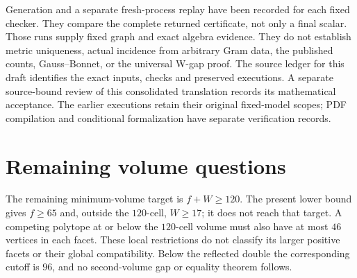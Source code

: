\documentclass[11pt]{article}
\theoremstyle{remark}
\begin{document}
Generation and a separate fresh-process replay have been recorded for
each fixed checker. They compare the complete returned certificate,
not only a final scalar. Those runs supply fixed graph and exact
algebra evidence. They do not establish metric uniqueness, actual
incidence from arbitrary Gram data, the published counts, Gauss--Bonnet,
or the universal W-gap proof. The source ledger for this draft identifies
the exact inputs, checks and preserved executions. A separate source-bound review of this consolidated translation records
its mathematical acceptance. The earlier executions retain their original
fixed-model scopes; PDF compilation and conditional formalization have
separate verification records.

\section{Remaining volume questions}

The remaining minimum-volume target is $f+W\ge120$. The present lower
bound gives $f\ge65$ and, outside the $120$-cell, $W\ge17$; it does
not reach that target. A competing polytope at or below the $120$-cell
volume must also have at most $46$ vertices in each facet. These local
restrictions do not classify its larger positive facets or their global
compatibility. Below the reflected double the corresponding cutoff is
$96$, and no second-volume gap or equality theorem follows.
\end{document}
